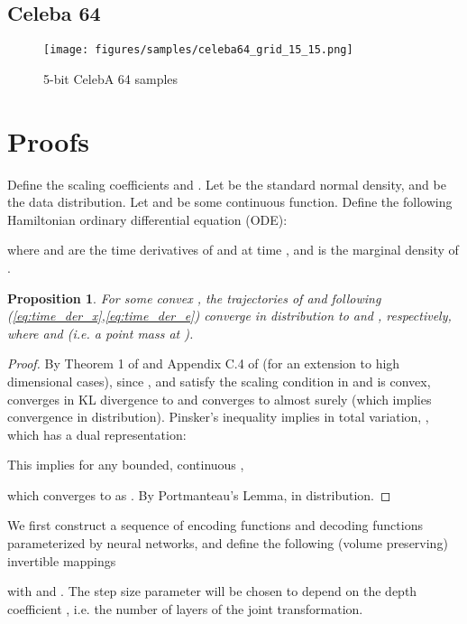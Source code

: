 \documentclass{article}
\newtheorem{proposition}{Proposition}
\begin{document}
\newpage
\subsection{Celeba 64}
\begin{figure*}[h!]
    \centering
    \texttt{[image: figures/samples/celeba64\_grid\_15\_15.png]}
    \caption{5-bit CelebA 64 samples}
    \label{fig:cifar_grid}
\end{figure*}



\newpage
\section{Proofs}
\label{app:proofs}

Define the scaling coefficients  and .
Let  be the standard normal density, and  be the data distribution.
Let  and  be some continuous function. 
Define the following Hamiltonian ordinary differential equation (ODE):

where  and  are the time derivatives of  and  at time , and  is the marginal density of . 

\begin{proposition}
For some convex , the trajectories of  and  following (\ref{eq:time_der_x},\ref{eq:time_der_e}) converge in distribution to  and , respectively, where  and  (i.e. a point mass at ).
\label{prop:hode}
\end{proposition}
\begin{proof}
By Theorem 1 of \citet{taghvaei19a} and Appendix C.4 of \citet{wang2019accelerated} (for an extension to high dimensional cases), 
since ,  and  satisfy the scaling condition in \citet{taghvaei19a} and  is convex,
 converges in KL divergence to  and  converges to  almost surely (which implies convergence in distribution). 
Pinsker's inequality implies  in total variation, , which has a dual representation:

This implies for any bounded, continuous ,

which converges to  as . 
By Portmanteau's Lemma,  in distribution.
\end{proof}

We first construct a sequence of encoding functions  and decoding functions  parameterized by neural networks, and define the following (volume preserving) invertible mappings

with  and . 
The step size parameter  will be chosen to depend on the depth coefficient , i.e. the number of layers of the joint transformation. 
\end{document}
